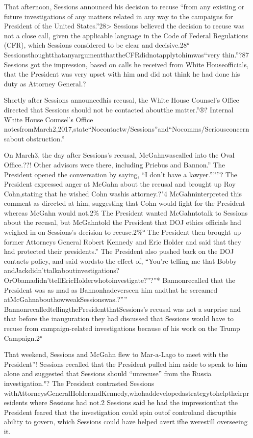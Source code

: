 That afternoon, Sessions announced his decision to recuse “from any existing or future investigations of any matters related in any way to the campaigns for President of the United States.”28>
Sessions believed the decision to recuse was not a close call, given the applicable language in the Code of Federal Regulations (CFR), which Sessions considered to be clear and decisive.28° SessionsthoughtthatanyargumentthattheCFRdidnotapplytohimwas“very thin.”?87
Sessions got the impression, based on calls he received from White Houseofficials, that the President was very upset with him and did not think he had done his duty as Attorney General.?

Shortly after Sessions announcedhis recusal, the White House Counsel’s Office directed that Sessions should not be contacted aboutthe matter.”®?
Internal White House Counsel’s Office notesfromMarch2,2017,state“Nocontactw/Sessions”and“Nocomms/Seriousconcernsabout obstruction.”

On March3, the day after Sessions’s recusal, McGahnwascalled into the Oval Office.??!
Other advisors were there, including Priebus and Bannon.”
The President opened the conversation by saying, “I don’t have a lawyer.”””?
The President expressed anger at McGahn about the recusal and brought up Roy Cohn,stating that he wished Cohn washis attorney.?"4
McGahninterpreted this comment as directed at him, suggesting that Cohn would fight for the President whereas McGahn would not.2\%
The President wanted McGahntotalk to Sessions about the recusal, but McGahntold the President that DOJ ethics officials had weighed in on Sessions’s decision to recuse.2\%°
The President then brought up former Attorneys General Robert Kennedy and Eric Holder and said that they had protected their presidents.”
The President also pushed back on the DOJ contacts policy, and said wordsto the effect of, “You’re telling me that Bobby andJackdidn’ttalkaboutinvestigations? OrObamadidn’ttellEricHolderwhotoinvestigate?”?”*
Bannonrecalled that the President was as mad as Bannonhadeverseen him andthat he screamed atMcGahnabouthowweakSessionswas.?””
BannonrecalledtellingthePresidentthatSessions’s recusal was not a surprise and that before the inauguration they had discussed that Sessions would have to recuse from campaign-related investigations because of his work on the Trump Campaign.2°

That weekend, Sessions and McGahn flew to Mar-a-Lago to meet with the President”!
Sessions recalled that the President pulled him aside to speak to him alone and suggested that Sessions should “unrecuse” from the Russia investigation.°?
The President contrasted Sessions withAttorneysGeneralHolderandKennedy,whohaddevelopedastrategytohelptheirpresidents where Sessions had not.2
Sessions said he had the impressionthat the President feared that the investigation could spin outof controland disrupthis ability to govern, which Sessions could have helped avert ifhe werestill overseeing it.

